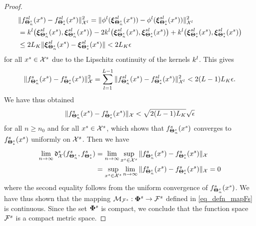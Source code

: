 \documentclass[review,supplement,onefignum,onetabnum]{siamonline250211}
\begin{document}
\begin{proof}
\begin{equation*}
\begin{split}
& \|  f^{sl}_{\boldsymbol{\Theta}^{s}_n} (x^s)  - f^{sl}_{\boldsymbol{\Theta}^{s}_*} (x^s) \|_{\mathcal{X}^l}^2
=  \|  \phi^l(\boldsymbol{\xi}^{sl}_{\boldsymbol{\Theta}^{s}_n} (x^s))   -   \phi^l(\boldsymbol{\xi}^{sl}_{\boldsymbol{\Theta}^{s}_*} (x^s))   \|_{\mathcal{X}^l}^2 \\
&=   k^l \big(\boldsymbol{\xi}^{sl}_{\boldsymbol{\Theta}^{s}_n} (x^s), \boldsymbol{\xi}^{sl}_{\boldsymbol{\Theta}^{s}_n} (x^s) \big)
- 2 k^l \big(\boldsymbol{\xi}^{sl}_{\boldsymbol{\Theta}^{s}_n} (x^s), \boldsymbol{\xi}^{sl}_{\boldsymbol{\Theta}^{s}_*} (x^s) \big)
+ k^l \big(\boldsymbol{\xi}^{sl}_{\boldsymbol{\Theta}^{s}_*} (x^s), \boldsymbol{\xi}^{sl}_{\boldsymbol{\Theta}^{s}_*} (x^s) \big)  \\
& \leq 2 L_K \| \boldsymbol{\xi}^{sl}_{\boldsymbol{\Theta}^{s}_n} (x^s) -  \boldsymbol{\xi}^{sl}_{\boldsymbol{\Theta}^{s}_*} (x^s) \|  
< 2 L_K \epsilon
\end{split}
\end{equation*}
for all $x^s \in \mathcal{X}^s$ due to the Lipschitz continuity of the kernels $k^l$. This gives
%
%
\begin{equation*}
\begin{split}
    \|  f^s_{\boldsymbol{\Theta}^{s}_n} (x^s)  - f^s_{\boldsymbol{\Theta}^{s}_*} (x^s) \|_{\mathcal{X}}^2
= \sum_{l=1}^{L-1} \|  f^{sl}_{\boldsymbol{\Theta}^{s}_n} (x^s)  - f^{sl}_{\boldsymbol{\Theta}^{s}_*} (x^s) \|_{\mathcal{X}^l}^2 
< 2 (L-1) L_K  \epsilon.
\end{split}
\end{equation*}
%
We have thus obtained
%
\begin{equation*}
\begin{split}
    \|  f^s_{\boldsymbol{\Theta}^{s}_n} (x^s)  - f^s_{\boldsymbol{\Theta}^{s}_*} (x^s) \|_{\mathcal{X}}
< \sqrt{2 (L-1) L_K } \sqrt{ \epsilon}
\end{split}
\end{equation*}
%
for all $n \geq n_0$ and for all $x^s \in \mathcal{X}^s$, which shows that $f^s_{\boldsymbol{\Theta}^{s}_n} (x^s)$ converges to $f^s_{\boldsymbol{\Theta}^{s}_*} (x^s)$ uniformly on $\mathcal{X}^s$. Then we have
%
\begin{equation*}
\begin{split}
\lim_{n \rightarrow \infty}  \mathfrak{d}^s_{\mathcal{X}} (f^s_{\boldsymbol{\Theta}^{s}_n} , f^s_{\boldsymbol{\Theta}^{s}_*}   ) 
&= \lim_{n \rightarrow \infty} \sup_{x^s \in \mathcal{X}^s} 
    \|  f^s_{\boldsymbol{\Theta}^{s}_n} (x^s)  - f^s_{\boldsymbol{\Theta}^{s}_*} (x^s) \|_{\mathcal{X}} \\
    &= \sup_{x^s \in \mathcal{X}^s} \lim_{n \rightarrow \infty}  \|  f^s_{\boldsymbol{\Theta}^{s}_n} (x^s)  - f^s_{\boldsymbol{\Theta}^{s}_*} (x^s) \|_{\mathcal{X}}
=0
\end{split}
\end{equation*}
%
where the second equality follows from the uniform convergence of $f^s_{\boldsymbol{\Theta}^{s}_n} (x^s)$. We have thus shown that the mapping $\mathcal{M}_{\mathcal{F}^s}: \mathbf{\Phi}^{s} \rightarrow \mathcal{F}^s$ defined in \eqref{eq_defn_mapFs} is continuous. Since the set $\mathbf{\Phi}^{s}$ is compact, we conclude that the function space $\mathcal{F}^s $ is a compact metric space.


\end{proof}
\end{document}
